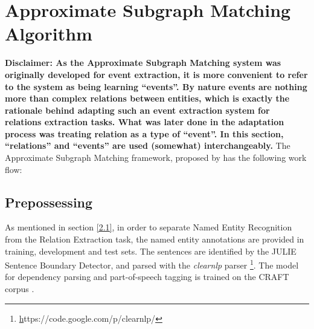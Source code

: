 \section{Approximate Subgraph Matching Algorithm}
\textbf{Disclaimer: As the Approximate Subgraph Matching system was originally developed for event extraction, it is more convenient to refer to the system as being learning ``events''. By nature events are nothing more than complex relations between entities, which is exactly the rationale behind adapting such an event extraction system for relations extraction tasks. What was later done in the adaptation process was treating relation as a type of ``event''. In this section, ``relations'' and ``events'' are used (somewhat) interchangeably. }\newline\newline
The Approximate Subgraph Matching framework, proposed by \citet{liu2013approximate} has the following work flow:
\subsection{Prepossessing}
As mentioned in section \ref{2.1}, in order to separate Named Entity Recognition from the Relation Extraction task, the named entity annotations are provided in training, development and test sets. The sentences are identified by the JULIE Sentence Boundary Detector\cite{tomanek2007sentence}, and parsed with the \emph{clearnlp} parser \footnote{\href{https://code.google.com/p/clearnlp/}https://code.google.com/p/clearnlp/}\cite{choi2013transition}. The model for dependency parsing and part-of-speech tagging is trained on the CRAFT corpus \cite{verspoor2012corpus}.
